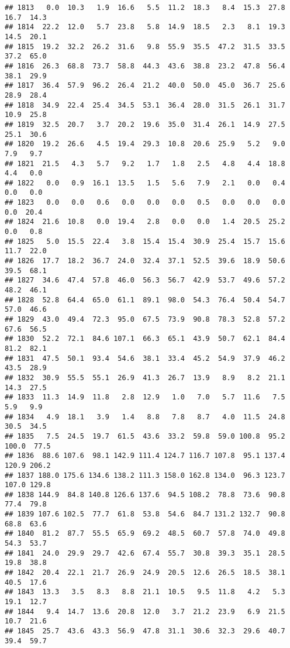 \documentclass[
]{article}
\begin{document}
\begin{verbatim}
## 1813   0.0  10.3   1.9  16.6   5.5  11.2  18.3   8.4  15.3  27.8  16.7  14.3
## 1814  22.2  12.0   5.7  23.8   5.8  14.9  18.5   2.3   8.1  19.3  14.5  20.1
## 1815  19.2  32.2  26.2  31.6   9.8  55.9  35.5  47.2  31.5  33.5  37.2  65.0
## 1816  26.3  68.8  73.7  58.8  44.3  43.6  38.8  23.2  47.8  56.4  38.1  29.9
## 1817  36.4  57.9  96.2  26.4  21.2  40.0  50.0  45.0  36.7  25.6  28.9  28.4
## 1818  34.9  22.4  25.4  34.5  53.1  36.4  28.0  31.5  26.1  31.7  10.9  25.8
## 1819  32.5  20.7   3.7  20.2  19.6  35.0  31.4  26.1  14.9  27.5  25.1  30.6
## 1820  19.2  26.6   4.5  19.4  29.3  10.8  20.6  25.9   5.2   9.0   7.9   9.7
## 1821  21.5   4.3   5.7   9.2   1.7   1.8   2.5   4.8   4.4  18.8   4.4   0.0
## 1822   0.0   0.9  16.1  13.5   1.5   5.6   7.9   2.1   0.0   0.4   0.0   0.0
## 1823   0.0   0.0   0.6   0.0   0.0   0.0   0.5   0.0   0.0   0.0   0.0  20.4
## 1824  21.6  10.8   0.0  19.4   2.8   0.0   0.0   1.4  20.5  25.2   0.0   0.8
## 1825   5.0  15.5  22.4   3.8  15.4  15.4  30.9  25.4  15.7  15.6  11.7  22.0
## 1826  17.7  18.2  36.7  24.0  32.4  37.1  52.5  39.6  18.9  50.6  39.5  68.1
## 1827  34.6  47.4  57.8  46.0  56.3  56.7  42.9  53.7  49.6  57.2  48.2  46.1
## 1828  52.8  64.4  65.0  61.1  89.1  98.0  54.3  76.4  50.4  54.7  57.0  46.6
## 1829  43.0  49.4  72.3  95.0  67.5  73.9  90.8  78.3  52.8  57.2  67.6  56.5
## 1830  52.2  72.1  84.6 107.1  66.3  65.1  43.9  50.7  62.1  84.4  81.2  82.1
## 1831  47.5  50.1  93.4  54.6  38.1  33.4  45.2  54.9  37.9  46.2  43.5  28.9
## 1832  30.9  55.5  55.1  26.9  41.3  26.7  13.9   8.9   8.2  21.1  14.3  27.5
## 1833  11.3  14.9  11.8   2.8  12.9   1.0   7.0   5.7  11.6   7.5   5.9   9.9
## 1834   4.9  18.1   3.9   1.4   8.8   7.8   8.7   4.0  11.5  24.8  30.5  34.5
## 1835   7.5  24.5  19.7  61.5  43.6  33.2  59.8  59.0 100.8  95.2 100.0  77.5
## 1836  88.6 107.6  98.1 142.9 111.4 124.7 116.7 107.8  95.1 137.4 120.9 206.2
## 1837 188.0 175.6 134.6 138.2 111.3 158.0 162.8 134.0  96.3 123.7 107.0 129.8
## 1838 144.9  84.8 140.8 126.6 137.6  94.5 108.2  78.8  73.6  90.8  77.4  79.8
## 1839 107.6 102.5  77.7  61.8  53.8  54.6  84.7 131.2 132.7  90.8  68.8  63.6
## 1840  81.2  87.7  55.5  65.9  69.2  48.5  60.7  57.8  74.0  49.8  54.3  53.7
## 1841  24.0  29.9  29.7  42.6  67.4  55.7  30.8  39.3  35.1  28.5  19.8  38.8
## 1842  20.4  22.1  21.7  26.9  24.9  20.5  12.6  26.5  18.5  38.1  40.5  17.6
## 1843  13.3   3.5   8.3   8.8  21.1  10.5   9.5  11.8   4.2   5.3  19.1  12.7
## 1844   9.4  14.7  13.6  20.8  12.0   3.7  21.2  23.9   6.9  21.5  10.7  21.6
## 1845  25.7  43.6  43.3  56.9  47.8  31.1  30.6  32.3  29.6  40.7  39.4  59.7

\end{verbatim}
\end{document}
